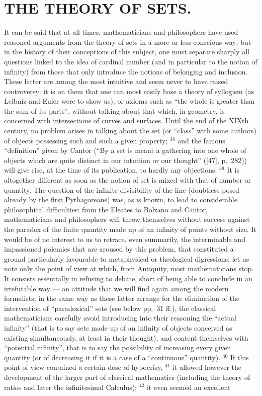 \section*{THE THEORY OF SETS.}
{}

It can be said that at all times, mathematicians and philosophers have used reasoned arguments from the theory of sets in a more or less conscious way; but in the history of their conceptions of this subject, one must separate sharply all questions linked to the idea of cardinal number (and in particular to the notion of infinity) from those that only introduce the notions of belonging and inclusion. These latter are among the most intuitive and seem never to have raised controversy: it is on them that one can most easily base a theory of syllogism (as Leibniz and Euler were to show us), or axioms such as ``the whole is greater than the sum of its parts'', without talking about that which, in geometry, is concerned with intersections of curves and surfaces. Until the end of the XIXth century, no problem arises in talking about the set (or ``class'' with some authors) of objects possessing such and such a given property; \(^{38}\) and the famous ``definition'' given by Cantor (``By a set is meant a gathering into one whole of objects which are quite distinct in our intuition or our thought'' ({[}47{]}, p.~282)) will give rise, at the time of its publication, to hardly any objections. \(^{39}\) It is altogether different as soon as the notion of set is mixed with that of number or quantity. The question of the infinite divisibility of the line (doubtless posed already by the first Pythagoreans) was, as is known, to lead to considerable philosophical difficulties: from the Eleates to Bolzano and Cantor, mathematicians and philosophers will throw themselves without success against the paradox of the finite quantity made up of an infinity of points without size. It would be of no interest to us to retrace, even summarily, the interminable and impassioned polemics that are aroused by this problem, that constituted a ground particularly favourable to metaphysical or theological digressions; let us note only the point of view at which, from Antiquity, most mathematicians stop. It consists essentially in refusing to debate, short of being able to conclude in an irrefutable way --- an attitude that we will find again among the modern formalists; in the same way as these latter arrange for the elimination of the intervention of ``paradoxical'' sets (see below pp.~31 ff.), the classical mathematicians carefully avoid introducing into their reasoning the ``actual infinity'' (that is to say sets made up of an infinity of objects conceived as existing simultaneously, at least in their thought), and content themselves with ``potential infinity'', that is to say the possibility of increasing every given quantity (or of decreasing it if it is a case of a ``continuous'' quantity). \(^{40}\) If this point of view contained a certain dose of hypocrisy, \(^{41}\) it allowed however the development of the larger part of classical mathematics (including the theory of ratios and later the infinitesimal Calculus); \(^{42}\) it even seemed an excellent 